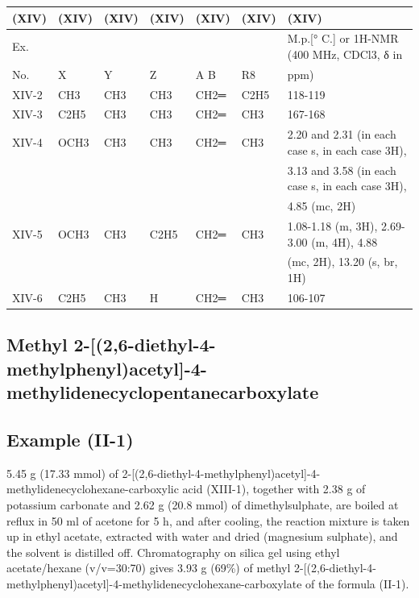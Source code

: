 \documentclass[11pt,a4paper]{article}
\begin{document}
\begin{table}[h]
\begin{tabular}{|l|l|l|l|l|l|l|}
\hline
(XIV) & (XIV) & (XIV) & (XIV) & (XIV) & (XIV) & (XIV) \\ \hline
Ex. &  &  &  &  &  & M.p.[° C.] or 1H-NMR (400 MHz, CDCl3, δ in \\ \hline
No. & X & Y & Z & A B & R8 & ppm) \\ \hline
XIV-2 & CH3 & CH3 & CH3 & CH2═ & C2H5 & 118-119 \\ \hline
XIV-3 & C2H5 & CH3 & CH3 & CH2═ & CH3 & 167-168 \\ \hline
XIV-4 & OCH3 & CH3 & CH3 & CH2═ & CH3 & 2.20 and 2.31 (in each case s, in each case 3H), \\ \hline
 &  &  &  &  &  & 3.13 and 3.58 (in each case s, in each case 3H), \\ \hline
 &  &  &  &  &  & 4.85 (mc, 2H) \\ \hline
XIV-5 & OCH3 & CH3 & C2H5 & CH2═ & CH3 & 1.08-1.18 (m, 3H), 2.69-3.00 (m, 4H), 4.88 \\ \hline
 &  &  &  &  &  & (mc, 2H), 13.20 (s, br, 1H) \\ \hline
XIV-6 & C2H5 & CH3 & H & CH2═ & CH3 & 106-107 \\ \hline
\end{tabular}
\end{table}

\subsection{Methyl 2-[(2,6-diethyl-4-methylphenyl)acetyl]-4-methylidenecyclopentanecarboxylate}

\subsection{Example (II-1)}

5.45 g (17.33 mmol) of 2-[(2,6-diethyl-4-methylphenyl)acetyl]-4-methylidenecyclohexane-carboxylic acid (XIII-1), together with 2.38 g of potassium carbonate and 2.62 g (20.8 mmol) of dimethylsulphate, are boiled at reflux in 50 ml of acetone for 5 h, and after cooling, the reaction mixture is taken up in ethyl acetate, extracted with water and dried (magnesium sulphate), and the solvent is distilled off. Chromatography on silica gel using ethyl acetate/hexane (v/v=30:70) gives 3.93 g (69\%) of methyl 2-[(2,6-diethyl-4-methylphenyl)acetyl]-4-methylidenecyclohexane-carboxylate of the formula (II-1).
\end{document}

